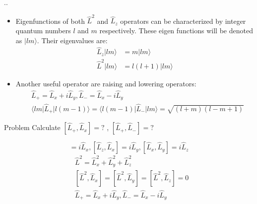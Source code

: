 \documentclass[handout]{beamer}
\begin{document}
\begin{frame}{\thesection.\thesubsection. \insertsubsection}
	\begin{itemize}[<+>]
		\item Eigenfunctions of both $\hat{L}^2$ and $\hat{L}_z$ operators can be characterized by integer quantum numbers $l$  and $m$ respectively. These eigen functions will be denoted as $\vert lm \rangle$. Their eigenvalues are:
		\begin{align}
		\hat{L}_z \vert lm \rangle &= m \vert lm \rangle \\
		\hat{L}^2 \vert lm \rangle &= l(l+1) \vert lm \rangle
		\end{align}
		\item Another useful operator are raising and lowering operators:
		\begin{align}
		  &\hat{L}_{+} = \hat{L}_x + i\hat{L}_y, \hat{L}_{-} = \hat{L}_x - i\hat{L}_y\\
		  &\langle lm \vert \hat{L}_{+} \vert l (m-1) \rangle = \langle l(m-1) \vert \hat{L}_{-} \vert lm \rangle = \sqrt{(l+m)(l-m+1)} \label{eq:L+}
		\end{align}
	\end{itemize}
	
\end{frame}

\begin{frame}
		\begin{block}{Problem}
			Calculate $[\hat{L}_{+}, \hat{L}_x ] = ?$ , $[\hat{L}_{+}, \hat{L}_{-} ] = ?$ 
		\end{block}
		\begin{equation*}
		[\hat{L}_y,\hat{L}_z] = i\hat{L}_x, [\hat{L}_z,\hat{L}_x] = i\hat{L}_y, [\hat{L}_x,\hat{L}_y] = i\hat{L}_z
		\end{equation*}
		\begin{align*}
		&\hat{L}^2 = \hat{L}_x^2 + \hat{L}_y^2 + \hat{L}_z^2 \\
		&[\hat{L}^2, \hat{L}_x]=[\hat{L}^2, \hat{L}_y]=[\hat{L}^2, \hat{L}_z]= 0    \\   
	    &\hat{L}_{+} = \hat{L}_x + i\hat{L}_y, \hat{L}_{-} = \hat{L}_x - i\hat{L}_y
		\end{align*}        


\end{frame}
\end{document}
